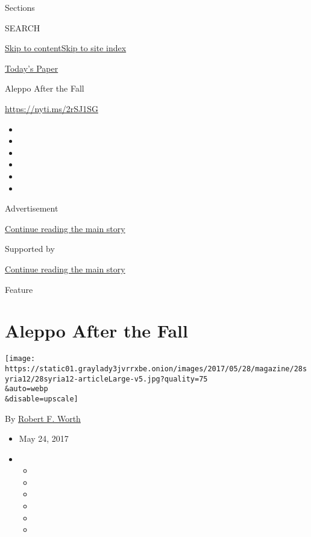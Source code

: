 Sections

SEARCH

\protect\hyperlink{site-content}{Skip to
content}\protect\hyperlink{site-index}{Skip to site index}

\href{https://myaccount.nytimes3xbfgragh.onion/auth/login?response_type=cookie\&client_id=vi}{}

\href{https://www.nytimes3xbfgragh.onion/section/todayspaper}{Today's
Paper}

Aleppo After the Fall

\url{https://nyti.ms/2rSJ1SG}

\begin{itemize}
\item
\item
\item
\item
\item
\item
\end{itemize}

Advertisement

\protect\hyperlink{after-top}{Continue reading the main story}

Supported by

\protect\hyperlink{after-sponsor}{Continue reading the main story}

Feature

\hypertarget{aleppo-after-the-fall}{%
\section{Aleppo After the Fall}\label{aleppo-after-the-fall}}

\texttt{[image: https://static01.graylady3jvrrxbe.onion/images/2017/05/28/magazine/28syria12/28syria12-articleLarge-v5.jpg?quality=75\\\&auto=webp\\\&disable=upscale]}

By \href{http://www.nytimes3xbfgragh.onion/by/robert-f-worth}{Robert F.
Worth}

\begin{itemize}
\item
  May 24, 2017
\item
  \begin{itemize}
  \item
  \item
  \item
  \item
  \item
  \item
  \end{itemize}
\end{itemize}


